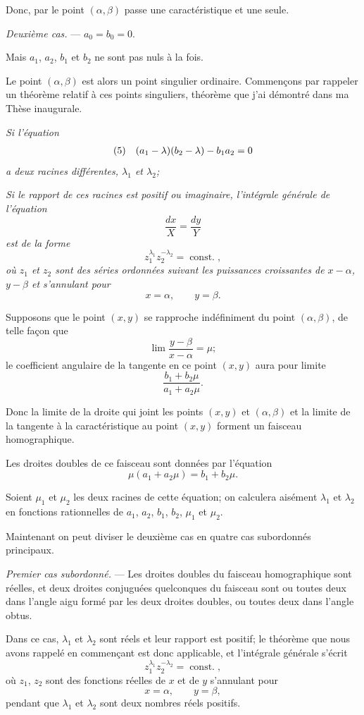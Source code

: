 \documentclass[11pt]{article}
\begin{document}
Donc, par le point $(\alpha,\beta)$ passe une caractéristique et une seule.

\emph{Deuxième cas.} --- $a_0=b_0=0$.

Mais $a_1$, $a_2$, $b_1$ et $b_2$ ne sont pas nuls à la fois.

Le point $(\alpha,\beta)$ est alors un point singulier ordinaire. Commençons par rappeler un théorème relatif à ces points singuliers, théorème que j’ai démontré dans ma Thèse inaugurale.

\emph{Si l’équation}
\[
\begin{array}{r@{\quad}c}
(5)&(a_1-\lambda)(b_2-\lambda)-b_1a_2=0
\end{array}
\]
\emph{a deux racines différentes, $\lambda_1$ et $\lambda_2$;} 

\emph{Si le rapport de ces racines est positif ou imaginaire, l’intégrale générale de l’équation}
\[
\frac{dx}{X}=\frac{dy}{Y}
\]
\emph{est de la forme}
\[
z_1^{\lambda_1}z_2^{-\lambda_2}=\operatorname{const.},
\]
\emph{où $z_1$ et $z_2$ sont des séries ordonnées suivant les puissances croissantes de $x-\alpha$, $y-\beta$ et s’annulant pour}
\[
x=\alpha,\qquad y=\beta.
\]

Supposons que le point $(x,y)$ se rapproche indéfiniment du point $(\alpha,\beta)$, de telle façon que
\[
\lim\frac{y-\beta}{x-\alpha}=\mu;
\]
le coefficient angulaire de la tangente en ce point $(x,y)$ aura pour limite
\[
\frac{b_1+b_2\mu}{a_1+a_2\mu}.
\]

Donc la limite de la droite qui joint les points $(x,y)$ et $(\alpha,\beta)$ et la limite de la tangente à la caractéristique au point $(x,y)$ forment un faisceau homographique.

Les droites doubles de ce faisceau sont données par l’équation
\[
\mu(a_1+a_2\mu)=b_1+b_2\mu.
\]

Soient $\mu_1$ et $\mu_2$ les deux racines de cette équation; on calculera aisément $\lambda_1$ et $\lambda_2$ en fonctions rationnelles de $a_1$, $a_2$, $b_1$, $b_2$, $\mu_1$ et $\mu_2$.

Maintenant on peut diviser le deuxième cas en quatre cas subordonnés principaux.

\emph{Premier cas subordonné.} --- Les droites doubles du faisceau homographique sont réelles, et deux droites conjuguées quelconques du faisceau sont ou toutes deux dans l’angle aigu formé par les deux droites doubles, ou toutes deux dans l’angle obtus.

Dans ce cas, $\lambda_1$ et $\lambda_2$ sont réels et leur rapport est positif; le théorème que nous avons rappelé en commençant est donc applicable, et l’intégrale générale s’écrit
\[
z_1^{\lambda_1}z_2^{-\lambda_2}=\operatorname{const.},
\]
où $z_1$, $z_2$ sont des fonctions réelles de $x$ et de $y$ s’annulant pour
\[
x=\alpha,\qquad y=\beta,
\]
pendant que $\lambda_1$ et $\lambda_2$ sont deux nombres réels positifs.
\end{document}
